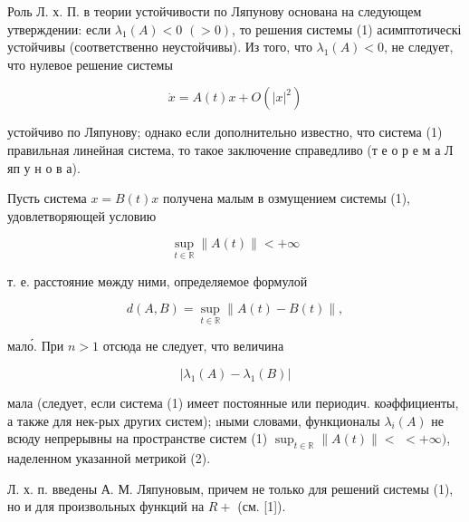 \documentclass[10pt]{article}
\begin{document}
Роль Л. х. П. в теории устойчивости по Ляпунову основана на следующем утверждении: если $\lambda_{1}(A)<0$ $(>0)$, то решения системы (1) асимптотическі устойчивы (соответственно неустойчивы). Из того, что $\lambda_{1}(A)<0$, не следует, что нулевое решение системы



\[

\dot{x}=A(t) x+O\left(|x|^{2}\right)

\]



устойчиво по Ляпунову; однако если дополнительно известно, что система (1) правильная линейная система, то такое заключение справедливо (т е о р е м а Л яп у н о в а).



Пусть система $x=B(t) x$ получена малым в озмущением системы (1), удовлетворяющей условию



\[

\sup _{t \in \mathbb{R}}\|A(t)\|<+\infty

\]



т. е. расстояние мөжду ними, определяемое формулой



\[

d(A, B)=\sup _{t \in \mathbb{R}}\|A(t)-B(t)\|,

\]



мало́. При $n>1$ отсюда не следует, что величина



\[

\left|\lambda_{1}(A)-\lambda_{1}(B)\right|

\]



мала (следует, если система (1) имеет постоянные или периодич. коәффициенты, а также для нек-рых других систем); ıными словами, функционалы $\lambda_{i}(A)$ не всюду непрерывны на пространстве систем (1) $\sup _{t \in \mathbb{R}}\|A(t)\|<$ $<+\infty)$, наделенном указанной метрикой (2).



Л. х. п. введены А. М. Ляпуновым, причем не только для решений системы (1), но и для произвольных функций на $R+$ (см. [1]).
\end{document}
